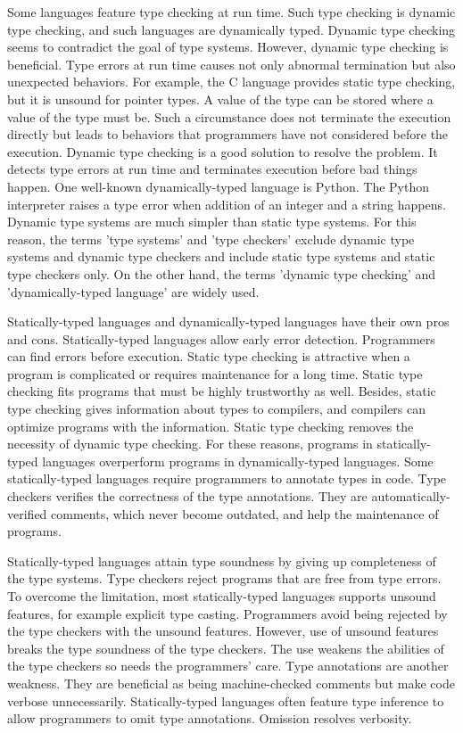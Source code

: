 Some languages feature type checking at run time. Such type checking is dynamic
type checking, and such languages are dynamically typed. Dynamic type checking
seems to contradict the goal of type systems. However, dynamic type checking is
beneficial. Type errors at run time causes not only abnormal termination but also
unexpected behaviors. For example, the C language provides static type checking,
but it is unsound for pointer types. A value of the  type can be
stored where a value of the  type must be. Such a circumstance does not
terminate the execution directly but leads to behaviors that programmers have not
considered before the execution. Dynamic type checking is a good solution to
resolve the problem. It detects type errors at run time and terminates execution
before bad things happen. One well-known dynamically-typed language is Python.
The Python interpreter raises a type error when addition of an integer and a
string happens. Dynamic type systems are much simpler than static type systems.
For this reason, the terms 'type systems' and 'type checkers' exclude dynamic
type systems and dynamic type checkers and include static type systems and static
type checkers only. On the other hand, the terms 'dynamic type checking' and
'dynamically-typed language' are widely used.

Statically-typed languages and dynamically-typed languages have their own pros
and cons. Statically-typed languages allow early error detection. Programmers can
find errors before execution. Static type checking is attractive when a program
is complicated or requires maintenance for a long time. Static type checking fits
programs that must be highly trustworthy as well. Besides, static type checking
gives information about types to compilers, and compilers can optimize programs
with the information. Static type checking removes the necessity of dynamic type
checking. For these reasons, programs in statically-typed languages overperform
programs in dynamically-typed languages. Some statically-typed languages require
programmers to annotate types in code. Type checkers verifies the correctness of
the type annotations. They are automatically-verified comments, which never
become outdated, and help the maintenance of programs.

Statically-typed languages attain type soundness by giving up completeness of the
type systems. Type checkers reject programs that are free from type errors. To
overcome the limitation, most statically-typed languages supports unsound
features, for example explicit type casting. Programmers avoid being rejected by
the type checkers with the unsound features. However, use of unsound features
breaks the type soundness of the type checkers. The use weakens the abilities of
the type checkers so needs the programmers' care. Type annotations are another
weakness. They are beneficial as being machine-checked comments but make code
verbose unnecessarily. Statically-typed languages often feature type inference to
allow programmers to omit type annotations. Omission resolves verbosity.

